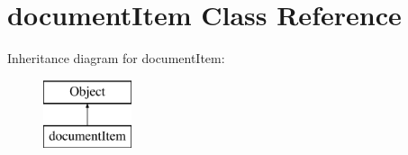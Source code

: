 \hypertarget{classdocumentItem}{\section{document\+Item Class Reference}
\label{classdocumentItem}
}
Inheritance diagram for document\+Item\+:\begin{figure}[H]
\begin{center}
\leavevmode
\includegraphics[height=2.000000cm]{classdocumentItem}
\end{center}
\end{figure}
